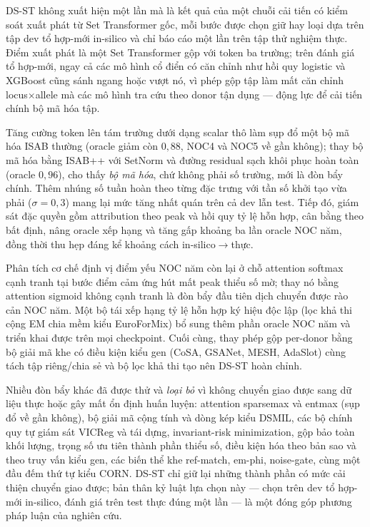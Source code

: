 \documentclass[12pt,a4paper]{article}
\begin{document}
DS-ST không xuất hiện một lần mà là kết quả của một chuỗi cải tiến có kiểm soát xuất phát từ Set Transformer gốc, mỗi bước được chọn giữ hay loại dựa trên tập dev tổ hợp-mới in-silico và chỉ báo cáo một lần trên tập thử nghiệm thực. Điểm xuất phát là một Set Transformer gộp với token ba trường; trên đánh giá tổ hợp-mới, ngay cả các mô hình cổ điển có căn chỉnh như hồi quy logistic và XGBoost cũng sánh ngang hoặc vượt nó, vì phép gộp tập làm mất căn chỉnh locus\(\times\)allele mà các mô hình tra cứu theo donor tận dụng — động lực để cải tiến chính bộ mã hóa tập.

Tăng cường token lên tám trường dưới dạng scalar thô làm sụp đổ một bộ mã hóa ISAB thường (oracle giảm còn \(0,88\), NOC4 và NOC5 về gần không); thay bộ mã hóa bằng ISAB++ với SetNorm và đường residual sạch khôi phục hoàn toàn (oracle \(0,96\)), cho thấy \emph{bộ mã hóa}, chứ không phải số trường, mới là đòn bẩy chính. Thêm nhúng số tuần hoàn theo từng đặc trưng với tần số khởi tạo vừa phải (\(\sigma=0,3\)) mang lại mức tăng nhất quán trên cả dev lẫn test. Tiếp đó, giám sát đặc quyền gồm attribution theo peak và hồi quy tỷ lệ hỗn hợp, cân bằng theo bất định, nâng oracle xếp hạng và tăng gấp khoảng ba lần oracle NOC năm, đồng thời thu hẹp đáng kể khoảng cách in-silico\(\rightarrow\)thực.

Phân tích cơ chế định vị điểm yếu NOC năm còn lại ở chỗ attention softmax cạnh tranh tại bước điểm cảm ứng hút mất peak thiểu số mờ; thay nó bằng attention sigmoid không cạnh tranh là đòn bẩy đầu tiên dịch chuyển được rào cản NOC năm. Một bộ tái xếp hạng tỷ lệ hỗn hợp ký hiệu độc lập (lọc khả thi cộng EM chia mềm kiểu EuroForMix) bổ sung thêm phần oracle NOC năm và triển khai được trên mọi checkpoint. Cuối cùng, thay phép gộp per-donor bằng bộ giải mã khe có điều kiện kiểu gen (CoSA, GSANet, MESH, AdaSlot) cùng tách tập riêng/chia sẻ và bộ lọc khả thi tạo nên DS-ST hoàn chỉnh.

Nhiều đòn bẩy khác đã được thử và \emph{loại bỏ} vì không chuyển giao được sang dữ liệu thực hoặc gây mất ổn định huấn luyện: attention sparsemax và entmax (sụp đổ về gần không), bộ giải mã cộng tính và dòng kép kiểu DSMIL, các bộ chính quy tự giám sát VICReg và tái dựng, invariant-risk minimization, gộp bảo toàn khối lượng, trọng số ưu tiên thành phần thiểu số, điều kiện hóa theo bản sao và theo truy vấn kiểu gen, các biến thể khe ref-match, em-phi, noise-gate, cùng một đầu đếm thứ tự kiểu CORN. DS-ST chỉ giữ lại những thành phần có mức cải thiện chuyển giao được; bản thân kỷ luật lựa chọn này — chọn trên dev tổ hợp-mới in-silico, đánh giá trên test thực đúng một lần — là một đóng góp phương pháp luận của nghiên cứu.
\end{document}
